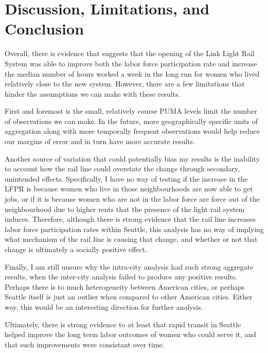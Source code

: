 \documentclass[A4paper,12pt]{article}
\begin{document}
\section{Discussion, Limitations, and Conclusion}

Overall, there is evidence that suggests that the opening of the Link Light Rail System was able to improve both the labor force participation rate and increase the median number of hours worked a week in the long run for women who lived relatively close to the new system. However, there are a few limitations that hinder the assumptions we can make with these results.

First and foremost is the small, relatively course PUMA levels limit the number of observations we can make. In the future, more geographically specific units of aggregation along with more temporally frequent observations would help reduce our margins of error and in turn have more accurate results. 

Another source of variation that could potentially bias my results is the inability to account how the rail line could overstate the change through secondary, unintended effects. Specifically, I have no way of testing if the increase in the LFPR is because women who live in those neighbourhoods are now able to get jobs, or if it is because women who are not in the labor force are force out of the neighbourhood due to higher rents that the presence of the light rail system induces. Therefore, although there is strong evidence that the rail line increases labor force participation rates within Seattle, this analysis has no way of implying what mechanism of the rail line is causing that change, and whether or not that change is ultimately a socially positive effect. 

Finally, I am still unsure why the intra-city analysis had such strong aggregate results, when the inter-city analysis failed to produce any positive results. Perhaps there is to much heterogeneity between American cities, or perhaps Seattle itself is just an outlier when compared to other American cities. Either way, this would be an interesting direction for further analysis. 

Ultimately, there is strong evidence to at least that rapid transit in Seattle helped improve the long term labor outcomes of women who could serve it, and that such improvements were consistant over time. 

\end{document}
